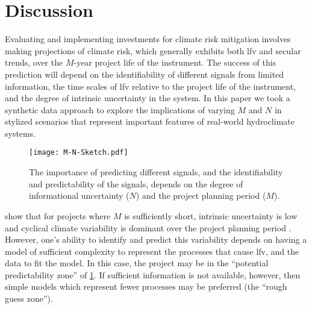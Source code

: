 \documentclass[
  draft,
  linenumbers
]{agujournal2019}
\begin{document}

\clearpage
\section{Discussion}\label{sec:discussion-conclusions}

Evaluating and implementing investments for climate risk mitigation involves making projections of climate risk, which generally exhibits both \gls{lfv} and secular trends, over the $M$-year project life of the instrument.
The success of this prediction will depend on the identifiability of different signals from limited information, the time scales of \gls{lfv} relative to the project life of the instrument, and the degree of intrinsic uncertainty in the system.
In this paper we took a synthetic data approach to explore the implications of varying $M$ and $N$ in stylized scenarios that represent important features of real-world hydroclimate systems.

\begin{figure}
  \centering
  \texttt{[image: M-N-Sketch.pdf]}
  \caption{
    The importance of predicting different signals, and the identifiability and predictability of the signals, depends on the degree of informational uncertainty ($N$) and the project planning period ($M$).
  }\label{fig:m-n-sketch}
\end{figure}

 show that for projects where $M$ is sufficiently short, intrinsic uncertainty is low and cyclical climate variability is dominant over the project planning period \citep{Jain:2001hz,Hodgkins:2017hw}.
However, one's ability to identify and predict this variability depends on having a model of sufficient complexity to represent the processes that cause \gls{lfv}, and the data to fit the model.
In this case, the project may be in the ``potential predictability zone'' of \cref{fig:m-n-sketch}.
If sufficient information is not available, however, then simple models which represent fewer processes may be preferred (the ``rough guess zone'').
\end{document}
